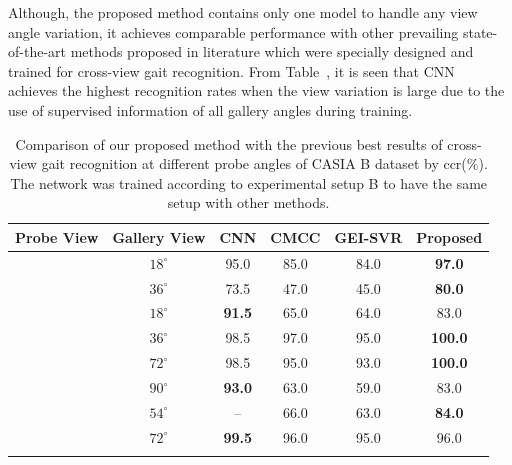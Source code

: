 Although, the proposed method contains only one model to handle any view angle variation, it achieves comparable performance with other prevailing state-of-the-art methods proposed in literature which were specially designed and trained for cross-view gait recognition. From Table~\cite{table:comp_casia_b_cross_view}, it is seen that CNN~\cite{Wu_17} achieves the highest recognition rates when the view variation is large due to the use of supervised information of all gallery angles during training.


\begin{table}
	\centering
	\caption[Comparison of our proposed method with the previous best results of cross-view gait recognition ]
	{Comparison of our proposed method with the previous best results of cross-view gait recognition at different probe angles of CASIA B dataset by \gls{ccr}(\%). The network was trained according to experimental setup B to have the same setup with other methods. \label{table:comp_casia_b_cross_view}}
	
	{\begin{tabular*}{29pc}{c|c|cccc}\hline  \rule{0pt}{2ex}
	Probe View &Gallery View &CNN &CMCC &GEI-SVR  &\textbf{Proposed} \\ \hline\rule{0pt}{3ex}
	
	\multirow{2}{*}{$0^{\circ}$} &$18^{\circ}$ &95.0 &85.0 &84.0 &\textbf{97.0} \\\rule{0pt}{2ex}
	
					&$36^{\circ}$ &73.5 &47.0 &45.0 &\textbf{80.0} \\ \hline\rule{0pt}{3ex}
	
	
	\multirow{4}{*}{$54^{\circ}$} &$18^{\circ}$ &\textbf{91.5} &65.0 &64.0  &83.0 \\\rule{0pt}{2ex}
	
			&$36^{\circ}$ &98.5 &97.0 &95.0 &\textbf{100.0} \\\rule{0pt}{2ex}
	
			&$72^{\circ}$ &98.5 &95.0 &93.0 &\textbf{100.0} \\\rule{0pt}{2ex}
	
			&$90^{\circ}$ &\textbf{93.0} &63.0 &59.0 &83.0 \\\hline\rule{0pt}{3ex}
	
	
	\multirow{4}{*}{$90^{\circ}$} &$54^{\circ}$ &-- &66.0 &63.0 &\textbf{84.0 }\\\rule{0pt}{2ex}
	
		&$72^{\circ}$ &\textbf{99.5} &96.0 &95.0 &96.0 \\ \rule{0pt}{2ex}
	

\end{tabular*}}
\end{table}
